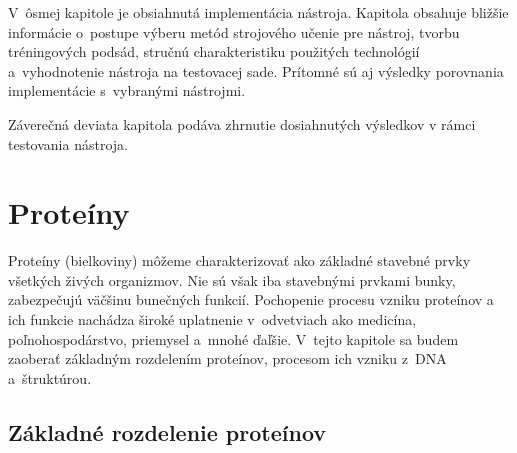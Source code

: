 V~ôsmej kapitole je obsiahnutá implementácia nástroja. Kapitola obsahuje bližšie informácie o~postupe výberu metód strojového učenie pre nástroj, tvorbu tréningových podsád, stručnú charakteristiku použitých technológií a~vyhodnotenie nástroja na testovacej sade. Prítomné sú aj výsledky porovnania implementácie s~vybranými nástrojmi. 

Záverečná deviata kapitola podáva zhrnutie dosiahnutých výsledkov v rámci testovania nástroja.


\chapter{Proteíny}

Proteíny (bielkoviny) môžeme charakterizovať ako základné stavebné prvky všetkých živých organizmov. Nie sú však iba stavebnými prvkami bunky, zabezpečujú väčšinu bunečných funkcií. Pochopenie procesu vzniku proteínov a ich funkcie nachádza široké uplatnenie v~odvetviach ako medicína, poľnohospodárstvo, priemysel a~mnohé ďaľšie. 
V~tejto kapitole sa budem zaoberať základným rozdelením proteínov, procesom ich vzniku z~DNA a~štruktúrou.

\section{Základné rozdelenie proteínov}

